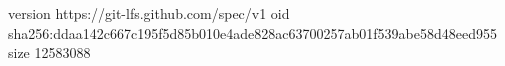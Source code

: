 version https://git-lfs.github.com/spec/v1
oid sha256:ddaa142c667c195f5d85b010e4ade828ac63700257ab01f539abe58d48eed955
size 12583088
